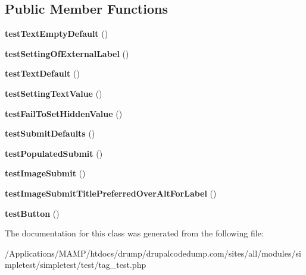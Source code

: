 \subsection*{Public Member Functions}
\begin{DoxyCompactItemize}
\item 
\hypertarget{class_test_of_widget_a526b509ddf79d7c7c2f629b0b22e71c3}{
{\bfseries testTextEmptyDefault} ()}
\label{class_test_of_widget_a526b509ddf79d7c7c2f629b0b22e71c3}

\item 
\hypertarget{class_test_of_widget_ac93711f9d6fb122e6940f54f0e8dd0be}{
{\bfseries testSettingOfExternalLabel} ()}
\label{class_test_of_widget_ac93711f9d6fb122e6940f54f0e8dd0be}

\item 
\hypertarget{class_test_of_widget_a8a380a75d7e3dd7deeac4f90ca9e6043}{
{\bfseries testTextDefault} ()}
\label{class_test_of_widget_a8a380a75d7e3dd7deeac4f90ca9e6043}

\item 
\hypertarget{class_test_of_widget_a8c22f467bef12de4816ad1038abf5b0f}{
{\bfseries testSettingTextValue} ()}
\label{class_test_of_widget_a8c22f467bef12de4816ad1038abf5b0f}

\item 
\hypertarget{class_test_of_widget_aaff0ae5b02ea4894b3fd7eca30084389}{
{\bfseries testFailToSetHiddenValue} ()}
\label{class_test_of_widget_aaff0ae5b02ea4894b3fd7eca30084389}

\item 
\hypertarget{class_test_of_widget_a135361b6fb2e19cb2b629007c3a2270c}{
{\bfseries testSubmitDefaults} ()}
\label{class_test_of_widget_a135361b6fb2e19cb2b629007c3a2270c}

\item 
\hypertarget{class_test_of_widget_a94c9fc30d799322adedeca4686d6ec3a}{
{\bfseries testPopulatedSubmit} ()}
\label{class_test_of_widget_a94c9fc30d799322adedeca4686d6ec3a}

\item 
\hypertarget{class_test_of_widget_a3d2cfbc9c97b4781370cee756c820ab8}{
{\bfseries testImageSubmit} ()}
\label{class_test_of_widget_a3d2cfbc9c97b4781370cee756c820ab8}

\item 
\hypertarget{class_test_of_widget_a1b3ef352b348d9082303391d04194a06}{
{\bfseries testImageSubmitTitlePreferredOverAltForLabel} ()}
\label{class_test_of_widget_a1b3ef352b348d9082303391d04194a06}

\item 
\hypertarget{class_test_of_widget_a5fff26eaa76a0c545f8ed23e4a4e9816}{
{\bfseries testButton} ()}
\label{class_test_of_widget_a5fff26eaa76a0c545f8ed23e4a4e9816}

\end{DoxyCompactItemize}


The documentation for this class was generated from the following file:\begin{DoxyCompactItemize}
\item 
/Applications/MAMP/htdocs/drump/drupalcodedump.com/sites/all/modules/simpletest/simpletest/test/tag\_\-test.php\end{DoxyCompactItemize}
